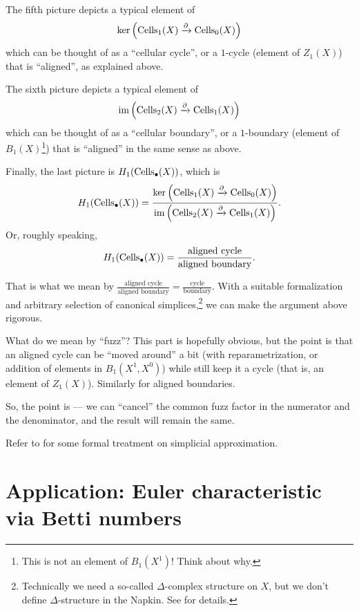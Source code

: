 \begin{itemize}
	\ii The fifth picture depicts a typical element of
	\[ \ker \left( \operatorname{Cells}_1(X) \xrightarrow{\partial} \operatorname{Cells}_0(X) \right) \]
	which can be thought of as a ``cellular cycle'', or a $1$-cycle
	(element of $Z_1(X)$) that is ``aligned'', as explained above.

	\ii The sixth picture depicts a typical element of
	\[ \operatorname{im} \left( \operatorname{Cells}_2(X) \xrightarrow{\partial} \operatorname{Cells}_1(X) \right) \]
	which can be thought of as a ``cellular boundary'', or a $1$-boundary
	(element of $B_1(X)$\footnote{This is not an element of $B_1(X^1)$! Think about why.}) that is ``aligned'' in the same sense as above.

	\ii Finally, the last picture is $H_1(\operatorname{Cells}_\bullet(X))$, which is
	\[ H_1(\operatorname{Cells}_\bullet(X)) = \frac{ \ker \left( \operatorname{Cells}_1(X) \xrightarrow{\partial} \operatorname{Cells}_0(X) \right) }{
	\operatorname{im} \left( \operatorname{Cells}_2(X) \xrightarrow{\partial} \operatorname{Cells}_1(X) \right) }. \]
	Or, roughly speaking,
	\[ H_1(\operatorname{Cells}_\bullet(X)) = \frac{\text{aligned cycle}}{\text{aligned boundary}}. \]
\end{itemize}
That is what we mean by $\frac{\text{aligned cycle}}{\text{aligned boundary}} =
\frac{\text{cycle}}{\text{boundary}}$.
With a suitable formalization and arbitrary selection of
canonical simplices,\footnote{Technically we need a so-called $\Delta$-complex structure on $X$, but
we don't define $\Delta$-structure in the Napkin. See \cite{ref:hatcher} for details.} we can
make the argument above rigorous.

What do we mean by ``fuzz''? This part is hopefully obvious, but the point is that an aligned cycle
can be ``moved around'' a bit (with reparametrization, or addition of elements in $B_1(X^1, X^0)$)
while still keep it a cycle (that is, an element of $Z_1(X)$). Similarly for aligned boundaries.

So, the point is --- we can ``cancel'' the common fuzz factor in the numerator and the denominator,
and the result will remain the same.

Refer to \cite{ref:hatcher} for some formal treatment on simplicial approximation.

\section{Application: Euler characteristic via Betti numbers}

